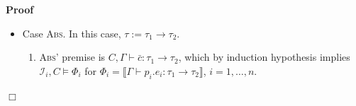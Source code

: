 \documentclass{article}
\newcommand{\assign}{:=}
\newcommand{\tmname}[1]{\textsc{#1}}
\newcommand{\tmop}[1]{\ensuremath{\operatorname{#1}}}
\newenvironment{proof}{\noindent\textbf{Proof\ }}{\hspace*{\fill}$\Box$\medskip}
\begin{document}
\begin{proof}
\begin{itemize}
\begin{enumerate}
      \item Let w.l.o.g. $\bar{\alpha}^{\prime} \bar{\beta}^{\prime} \#
      \tmop{FV} (C, \Gamma, \tau)$. By weakening and {\tmname{Equ}}, (1) gives
      $C \wedge \bar{\alpha}^{\prime} \bar{\beta}^{\prime} \dot{=}
      \bar{\alpha} \bar{\beta}, \Gamma \vdash e_i : \tau_i [\bar{\alpha}
      \bar{\beta} \assign \bar{\alpha}^{\prime} \bar{\beta}^{\prime}]$.
      
      \item Let $\Phi_i = \llbracket \Gamma \vdash e_i : \tau_i [\bar{\alpha}
      \bar{\beta} \assign \bar{\alpha}^{\prime} \bar{\beta}^{\prime}]
      \rrbracket$. By induction hypothesis, $\mathcal{I}_i, C \wedge
      \bar{\alpha}^{\prime} \bar{\beta}^{\prime} \dot{=} \bar{\alpha}
      \bar{\beta} \vDash \Phi_i$, $i = 1, \ldots, n$.
      
      \item Observe, that (1) and (3) imply $\mathcal{I}_i, C \wedge
      \bar{\alpha}^{\prime} \bar{\beta}^{\prime} \dot{=} \bar{\alpha}
      \bar{\beta} \vDash \wedge_i \Phi_i \wedge D [\bar{\alpha} \bar{\beta}
      \assign {\nobreak} \bar{\alpha}^{\prime} \bar{\beta}^{\prime}] \wedge
      \varepsilon (\bar{\alpha}^{\prime}) \dot{=} \varepsilon (\bar{\alpha})$.
      
      \item By non-emptiness of sorts and because the premise $\tmop{PV} (C,
      \Gamma) = {\nobreak} \varnothing$ gives disjoint domains for the
      $\mathcal{I}_i$, (4) and (2) imply $\mathcal{I}_1 \ldots \mathcal{I}_n,
      C \vDash \exists \bar{\alpha}^{\prime} \bar{\beta}^{\prime} . \wedge_i
      \Phi_i \wedge D [\bar{\alpha} \bar{\beta} \assign \bar{\alpha}^{\prime}
      \bar{\beta}^{\prime}] \wedge \varepsilon (\bar{\alpha}^{\prime}) \dot{=}
      \varepsilon (\bar{\alpha})$.
      
      \item By (1) and (5), $\mathcal{I}, C \vDash \llbracket \Gamma \vdash K
      e_1 \ldots e_n : \tau \rrbracket$ for $\mathcal{I}=\mathcal{I}_1 \ldots
      \mathcal{I}_n$.
    \end{enumerate}
    \item Case {\tmname{Abs}}. In this case, $\tau \assign \tau_1 \rightarrow
    \tau_2$.
    \begin{enumerate}
      \item {\tmname{Abs}}' premise is $C, \Gamma \vdash \bar{c} : \tau_1
      \rightarrow \tau_2$, which by induction hypothesis implies
      $\mathcal{I}_i, C \vDash \Phi_i$ for $\Phi_i = \llbracket \Gamma \vdash
      p_i .e_i : \tau_1 \rightarrow \tau_2 \rrbracket$, $i = 1, \ldots, n$.
      

\end{enumerate}
\end{itemize}
\end{proof}
\end{document}
